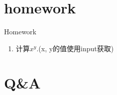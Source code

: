 \documentclass{beamer}
\begin{document}
\section{homework}
\begin{frame}{Homework}
\begin{enumerate}
\item
计算$x^{y}$.(x, y的值使用input获取)
\end{enumerate}
\end{frame}
\section{Q\&A}
\begin{frame}
\end{frame}


%
\end{document}
